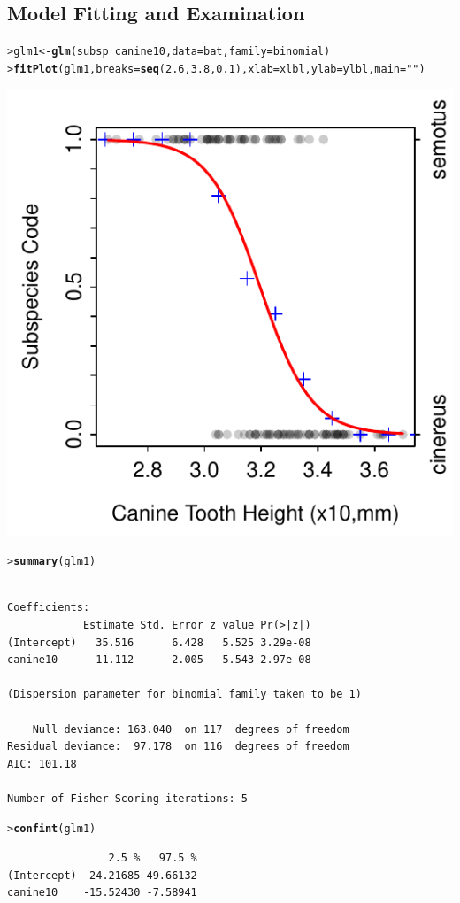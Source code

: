 \documentclass{article}\usepackage[]{graphicx}\usepackage[]{color}
\makeatletter
\newcommand{\hlnum}[1]{\textcolor[rgb]{0.686,0.059,0.569}{#1}}%
\newcommand{\hlstr}[1]{\textcolor[rgb]{0.192,0.494,0.8}{#1}}%
\newcommand{\hlopt}[1]{\textcolor[rgb]{0,0,0}{#1}}%
\newcommand{\hlstd}[1]{\textcolor[rgb]{0.345,0.345,0.345}{#1}}%
\newcommand{\hlkwb}[1]{\textcolor[rgb]{0.69,0.353,0.396}{#1}}%
\newcommand{\hlkwc}[1]{\textcolor[rgb]{0.333,0.667,0.333}{#1}}%
\newcommand{\hlkwd}[1]{\textcolor[rgb]{0.737,0.353,0.396}{\textbf{#1}}}%
\newenvironment{kframe}{%
 \def\at@end@of@kframe{}%
 \ifinner\ifhmode%
  \def\at@end@of@kframe{\end{minipage}}%
  \begin{minipage}{\columnwidth}%
 \fi\fi%
 \def\FrameCommand##1{\hskip\@totalleftmargin \hskip-\fboxsep
 \colorbox{shadecolor}{##1}\hskip-\fboxsep
     \hskip-\linewidth \hskip-\@totalleftmargin \hskip\columnwidth}%
 \MakeFramed {\advance\hsize-\width
   \@totalleftmargin\z@ \linewidth\hsize
   \@setminipage}}%
 {\par\unskip\endMakeFramed%
 \at@end@of@kframe}
\newenvironment{knitrout}{}{} %
\makeatother
\begin{document}
\newpage
\subsection{Model Fitting and Examination}
\begin{knitrout}
\color{fgcolor}\begin{kframe}
\begin{alltt}
\hlstd{> }\hlstd{glm1} \hlkwb{<-} \hlkwd{glm}\hlstd{(subsp}\hlopt{~}\hlstd{canine10,}\hlkwc{data}\hlstd{=bat,}\hlkwc{family}\hlstd{=binomial)}
\hlstd{> }\hlkwd{fitPlot}\hlstd{(glm1,}\hlkwc{breaks}\hlstd{=}\hlkwd{seq}\hlstd{(}\hlnum{2.6}\hlstd{,}\hlnum{3.8}\hlstd{,}\hlnum{0.1}\hlstd{),}\hlkwc{xlab}\hlstd{=xlbl,}\hlkwc{ylab}\hlstd{=ylbl,}\hlkwc{main}\hlstd{=}\hlstr{""}\hlstd{)}
\end{alltt}
\end{kframe}

{\centering \includegraphics[width=.4\linewidth]{Figs/BatFLP-1} 

}


\begin{kframe}\begin{alltt}
\hlstd{> }\hlkwd{summary}\hlstd{(glm1)}
\end{alltt}
\begin{verbatim}

Coefficients:
            Estimate Std. Error z value Pr(>|z|)
(Intercept)   35.516      6.428   5.525 3.29e-08
canine10     -11.112      2.005  -5.543 2.97e-08

(Dispersion parameter for binomial family taken to be 1)

    Null deviance: 163.040  on 117  degrees of freedom
Residual deviance:  97.178  on 116  degrees of freedom
AIC: 101.18

Number of Fisher Scoring iterations: 5
\end{verbatim}
\begin{alltt}
\hlstd{> }\hlkwd{confint}\hlstd{(glm1)}
\end{alltt}


{\ttfamily\noindent\itshape\color{messagecolor}{Waiting for profiling to be done...}}\begin{verbatim}
                2.5 %   97.5 %
(Intercept)  24.21685 49.66132
canine10    -15.52430 -7.58941
\end{verbatim}
\end{kframe}
\end{knitrout}
\end{document}
